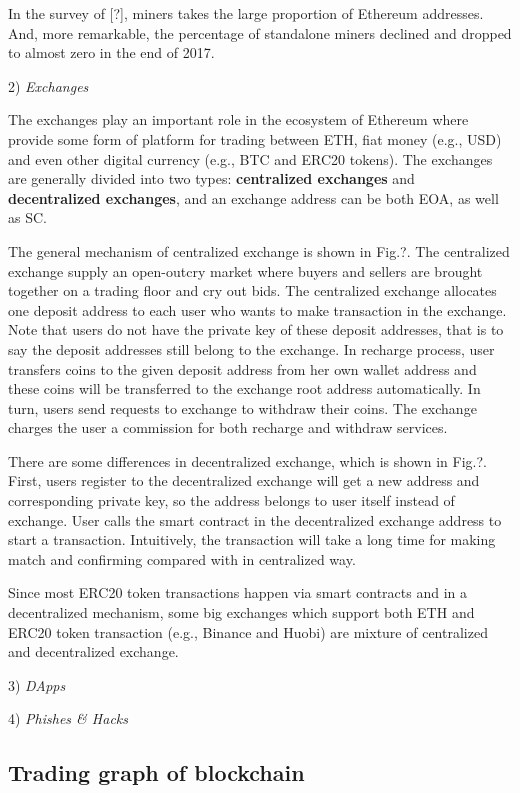 In the survey of [?], miners takes the large proportion of Ethereum addresses. And, more remarkable, the percentage of standalone miners declined and dropped to almost zero in the end of 2017. 

2) \emph{Exchanges}

The exchanges play an important role in the ecosystem of Ethereum where provide some form of platform for trading between ETH, fiat money (e.g., USD) and even other digital currency (e.g., BTC and ERC20 tokens). The exchanges are generally divided into two types: \textbf{centralized exchanges} and \textbf{decentralized exchanges}, and an exchange address can be both EOA, as well as SC. 

The general mechanism of centralized exchange is shown in Fig.?. The centralized exchange supply an open-outcry market where buyers and sellers are brought together on a trading floor and cry out bids. The centralized exchange allocates one deposit address to each user who wants to make transaction in the exchange. Note that users do not have the private key of these deposit addresses, that is to say the deposit addresses still belong to the exchange. In recharge process, user transfers coins to the given deposit address from her own wallet address and these coins will be transferred to the exchange root address automatically. In turn, users send requests to exchange to withdraw their coins. The exchange charges the user a commission for both recharge and withdraw services.

There are some differences in decentralized exchange, which is shown in Fig.?. First, users register to the decentralized exchange will get a new address and corresponding private key, so the address belongs to user itself instead of exchange. User calls the smart contract in the decentralized exchange address to start a transaction. Intuitively, the transaction will take a long time for making match and confirming compared with in centralized way.

Since most ERC20 token transactions happen via smart contracts and in a decentralized mechanism, some big exchanges which support both ETH and ERC20 token transaction (e.g., Binance and Huobi) are mixture of centralized and decentralized exchange.

3) \emph{DApps}

4) \emph{Phishes \& Hacks}

\subsection{Trading graph of blockchain}

